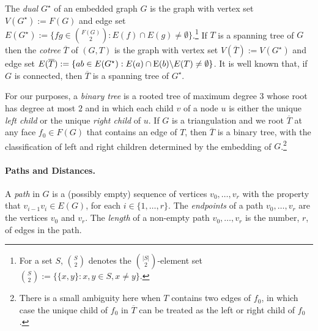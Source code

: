 \documentclass{patmorin}
\DeclareMathOperator{\dist}{dist}
\begin{document}
The \emph{dual} $G^\star$ of an embedded graph $G$ is the graph with vertex set $V(G^\star):=F(G)$ and edge set $E(G^{\star}):=\{fg\in \binom{F(G)}{2}:E(f)\cap E(g)\neq\emptyset\}$.\footnote{For a set $S$, $\binom{S}{2}$ denotes the $\binom{|S|}{2}$-element set $\binom{S}{2}:=\{\{x,y\}:x,y\in S, x\neq y\}$.} If $T$ is a spanning tree of $G$ then the \emph{cotree} $\overline{T}$ of $(G,T)$ is the graph with vertex set $V(\overline{T}) := V(G^\star)$ and edge set $E(\overline{T}) := \{ab \in E(G^\star) : E(a) \cap \mathrm{E}(b) \backslash E(T) \neq \emptyset \}$. It is well known that, if $G$ is connected, then $\overline{T}$ is a spanning tree of $G^\star$.

For our purposes, a \emph{binary tree} is a rooted tree of maximum degree $3$ whose root has degree at most $2$ and in which each child $v$ of a node $u$ is either the unique \emph{left child} or the unique \emph{right child} of $u$.  If $G$ is a triangulation  and we root $\overline{T}$ at any face $f_0\in F(G)$ that contains an edge of $T$, then $\overline{T}$ is a binary tree, with the classification of left and right children determined by the embedding of $G$.\footnote{There is a small ambiguity here when $T$ contains two edges of $f_0$, in which case the unique child of $f_0$ in $\overline{T}$ can be treated as the left or right child of $f_0$.}


\paragraph{Paths and Distances.}

A \emph{path} in $G$ is a (possibly empty) sequence of vertices $v_0,\ldots,v_r$ with the property that $v_{i-1}v_i\in E(G)$, for each $i\in\{1,\ldots,r\}$.  The \emph{endpoints} of a path $v_0,\ldots,v_r$ are the vertices $v_0$ and $v_r$.
The \emph{length} of a non-empty path $v_0,\ldots,v_r$ is the number, $r$, of edges in the path.
%
\end{document}
